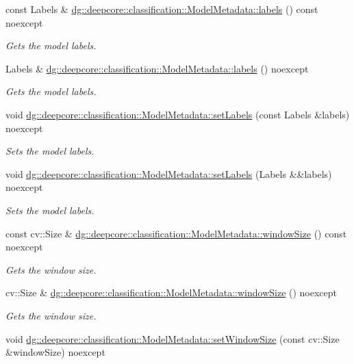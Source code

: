 \begin{DoxyCompactItemize}
const Labels \& \hyperlink{group___classification_module_ga123240dad792cb90b049e23cebabf178}{dg\+::deepcore\+::classification\+::\+Model\+Metadata\+::labels} () const noexcept
\begin{DoxyCompactList}\small\item\em Gets the model labels. \end{DoxyCompactList}\item 
Labels \& \hyperlink{group___classification_module_ga1f12a576a1db3447388f9a5660fa435a}{dg\+::deepcore\+::classification\+::\+Model\+Metadata\+::labels} () noexcept
\begin{DoxyCompactList}\small\item\em Gets the model labels. \end{DoxyCompactList}\item 
void \hyperlink{group___classification_module_gaa1e25ad45522aa213111143f91655bd6}{dg\+::deepcore\+::classification\+::\+Model\+Metadata\+::set\+Labels} (const Labels \&labels) noexcept
\begin{DoxyCompactList}\small\item\em Sets the model labels. \end{DoxyCompactList}\item 
void \hyperlink{group___classification_module_ga993c6e22ad71a3843fa4e737a29301a9}{dg\+::deepcore\+::classification\+::\+Model\+Metadata\+::set\+Labels} (Labels \&\&labels) noexcept
\begin{DoxyCompactList}\small\item\em Sets the model labels. \end{DoxyCompactList}\item 
const cv\+::\+Size \& \hyperlink{group___classification_module_ga630682de2af39cabdad720964e5047e9}{dg\+::deepcore\+::classification\+::\+Model\+Metadata\+::window\+Size} () const noexcept
\begin{DoxyCompactList}\small\item\em Gets the window size. \end{DoxyCompactList}\item 
cv\+::\+Size \& \hyperlink{group___classification_module_ga44f6f6da4f8738af4aa302524e7929ce}{dg\+::deepcore\+::classification\+::\+Model\+Metadata\+::window\+Size} () noexcept
\begin{DoxyCompactList}\small\item\em Gets the window size. \end{DoxyCompactList}\item 
void \hyperlink{group___classification_module_gac52cca4a6595cde91a1db6a76ab53eb0}{dg\+::deepcore\+::classification\+::\+Model\+Metadata\+::set\+Window\+Size} (const cv\+::\+Size \&window\+Size) noexcept

\end{DoxyCompactItemize}
